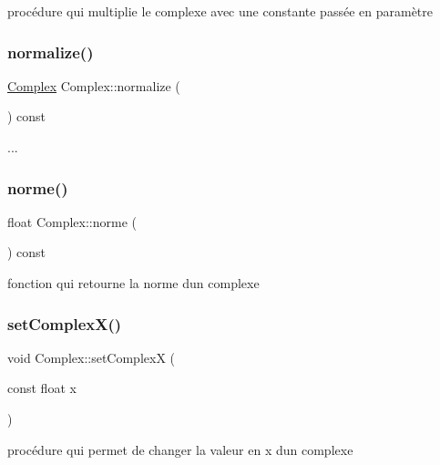 procédure qui multiplie le complexe avec une constante passée en paramètre 

\mbox{\label{classComplex_abd979d452f329db5df473395b2dca65f}} 
\subsubsection{\texorpdfstring{normalize()}{normalize()}}
{\footnotesize\ttfamily \hyperlink{classComplex}{Complex} Complex\+::normalize (\begin{DoxyParamCaption}{ }\end{DoxyParamCaption}) const}



... 

\mbox{\label{classComplex_a89cc3ed3da1f0365c64fc289f85417c2}} 
\subsubsection{\texorpdfstring{norme()}{norme()}}
{\footnotesize\ttfamily float Complex\+::norme (\begin{DoxyParamCaption}{ }\end{DoxyParamCaption}) const}



fonction qui retourne la norme d\textquotesingle{}un complexe 

\mbox{\label{classComplex_a8a2882e0732b0744947010d2af9dd3a0}} 
\subsubsection{\texorpdfstring{set\+Complex\+X()}{setComplexX()}}
{\footnotesize\ttfamily void Complex\+::set\+ComplexX (\begin{DoxyParamCaption}\item[{const float}]{x }\end{DoxyParamCaption})}



procédure qui permet de changer la valeur en x d\textquotesingle{}un complexe 

\mbox{\label{classComplex_ab72421580500156ec1e421c443ac636b}} 
